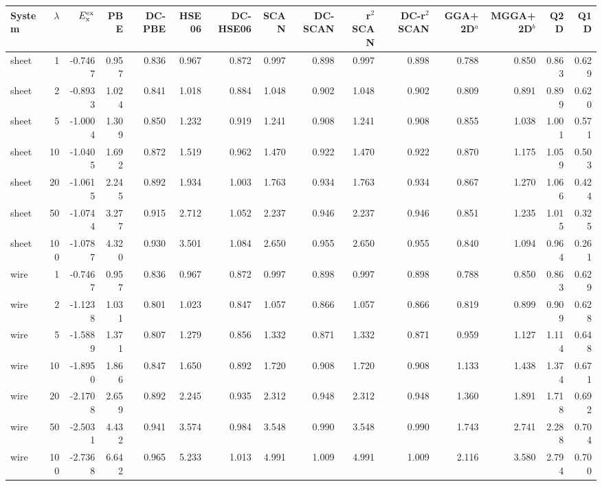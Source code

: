 \begin{tabular}{lrrrrrrrrrrrrrr}
\toprule
System & $\lambda$ & $E_{\rm x}^{\rm ex}$ & PBE & DC-PBE & HSE06 & DC-HSE06 & SCAN & DC-SCAN & r$^2$SCAN & DC-r$^2$SCAN & GGA+2D$^a$ & MGGA+2D$^b$ & Q2D & Q1D \\
\midrule
sheet & 1 & -0.7467 & 0.957 & 0.836 & 0.967 & 0.872 & 0.997 & 0.898 & 0.997 & 0.898 & 0.788 & 0.850 & 0.863 & 0.629 \\
sheet & 2 & -0.8933 & 1.024 & 0.841 & 1.018 & 0.884 & 1.048 & 0.902 & 1.048 & 0.902 & 0.809 & 0.891 & 0.899 & 0.620 \\
sheet & 5 & -1.0004 & 1.309 & 0.850 & 1.232 & 0.919 & 1.241 & 0.908 & 1.241 & 0.908 & 0.855 & 1.038 & 1.001 & 0.571 \\
sheet & 10 & -1.0405 & 1.692 & 0.872 & 1.519 & 0.962 & 1.470 & 0.922 & 1.470 & 0.922 & 0.870 & 1.175 & 1.059 & 0.503 \\
sheet & 20 & -1.0615 & 2.245 & 0.892 & 1.934 & 1.003 & 1.763 & 0.934 & 1.763 & 0.934 & 0.867 & 1.270 & 1.066 & 0.424 \\
sheet & 50 & -1.0744 & 3.277 & 0.915 & 2.712 & 1.052 & 2.237 & 0.946 & 2.237 & 0.946 & 0.851 & 1.235 & 1.015 & 0.325 \\
sheet & 100 & -1.0787 & 4.320 & 0.930 & 3.501 & 1.084 & 2.650 & 0.955 & 2.650 & 0.955 & 0.840 & 1.094 & 0.964 & 0.261 \\
\midrule
wire & 1 & -0.7467 & 0.957 & 0.836 & 0.967 & 0.872 & 0.997 & 0.898 & 0.997 & 0.898 & 0.788 & 0.850 & 0.863 & 0.629 \\
wire & 2 & -1.1238 & 1.031 & 0.801 & 1.023 & 0.847 & 1.057 & 0.866 & 1.057 & 0.866 & 0.819 & 0.899 & 0.909 & 0.628 \\
wire & 5 & -1.5889 & 1.371 & 0.807 & 1.279 & 0.856 & 1.332 & 0.871 & 1.332 & 0.871 & 0.959 & 1.127 & 1.114 & 0.648 \\
wire & 10 & -1.8950 & 1.866 & 0.847 & 1.650 & 0.892 & 1.720 & 0.908 & 1.720 & 0.908 & 1.133 & 1.438 & 1.374 & 0.671 \\
wire & 20 & -2.1708 & 2.659 & 0.892 & 2.245 & 0.935 & 2.312 & 0.948 & 2.312 & 0.948 & 1.360 & 1.891 & 1.718 & 0.692 \\
wire & 50 & -2.5031 & 4.432 & 0.941 & 3.574 & 0.984 & 3.548 & 0.990 & 3.548 & 0.990 & 1.743 & 2.741 & 2.288 & 0.704 \\
wire & 100 & -2.7368 & 6.642 & 0.965 & 5.233 & 1.013 & 4.991 & 1.009 & 4.991 & 1.009 & 2.116 & 3.580 & 2.794 & 0.700 \\
\bottomrule
\end{tabular}
